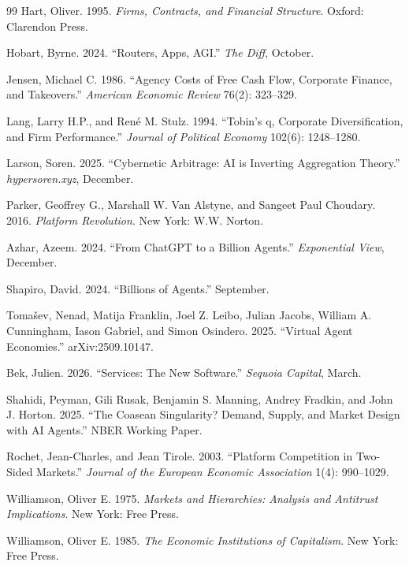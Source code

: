 \documentclass[12pt]{article}
\theoremstyle{definition}
\begin{document}
\begin{thebibliography}{99}
Hart, Oliver. 1995. \textit{Firms, Contracts, and Financial Structure}. Oxford: Clarendon Press.

Hobart, Byrne. 2024. ``Routers, Apps, AGI.'' \textit{The Diff}, October.

Jensen, Michael C. 1986. ``Agency Costs of Free Cash Flow, Corporate Finance, and Takeovers.'' \textit{American Economic Review} 76(2): 323--329.

Lang, Larry H.P., and Ren\'{e} M. Stulz. 1994. ``Tobin's q, Corporate Diversification, and Firm Performance.'' \textit{Journal of Political Economy} 102(6): 1248--1280.

Larson, Soren. 2025. ``Cybernetic Arbitrage: AI is Inverting Aggregation Theory.'' \textit{hypersoren.xyz}, December.

Parker, Geoffrey G., Marshall W. Van Alstyne, and Sangeet Paul Choudary. 2016. \textit{Platform Revolution}. New York: W.W. Norton.

Azhar, Azeem. 2024. ``From ChatGPT to a Billion Agents.'' \textit{Exponential View}, December.

Shapiro, David. 2024. ``Billions of Agents.'' September.

Toma\v{s}ev, Nenad, Matija Franklin, Joel Z. Leibo, Julian Jacobs, William A. Cunningham, Iason Gabriel, and Simon Osindero. 2025. ``Virtual Agent Economies.'' arXiv:2509.10147.

Bek, Julien. 2026. ``Services: The New Software.'' \textit{Sequoia Capital}, March.

Shahidi, Peyman, Gili Rusak, Benjamin S. Manning, Andrey Fradkin, and John J. Horton. 2025. ``The Coasean Singularity? Demand, Supply, and Market Design with AI Agents.'' NBER Working Paper.

Rochet, Jean-Charles, and Jean Tirole. 2003. ``Platform Competition in Two-Sided Markets.'' \textit{Journal of the European Economic Association} 1(4): 990--1029.

Williamson, Oliver E. 1975. \textit{Markets and Hierarchies: Analysis and Antitrust Implications}. New York: Free Press.

Williamson, Oliver E. 1985. \textit{The Economic Institutions of Capitalism}. New York: Free Press.

\end{thebibliography}
\end{document}
